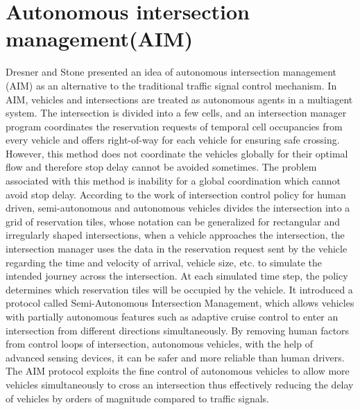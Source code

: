 \documentclass{book}
\begin{document}
	\section{Autonomous intersection management(AIM)}
	Dresner and Stone \cite{dresner2008multiagent} presented an idea of autonomous intersection management (AIM) as an alternative to the traditional traffic signal control mechanism. In AIM, vehicles and intersections are treated as autonomous agents in a multiagent system. The intersection is divided into a few cells, and an intersection manager program coordinates the reservation requests of temporal cell occupancies from every vehicle and
offers right-of-way for each vehicle for ensuring safe crossing. However, this method does not coordinate the vehicles globally for their optimal flow and therefore stop delay cannot be avoided sometimes. The problem associated with this method is inability for a global coordination which cannot avoid stop delay. According to the work of \cite{au2015autonomous} intersection control policy for human driven, semi-autonomous and autonomous vehicles divides the intersection into a grid of reservation tiles, whose notation can be generalized for rectangular and irregularly shaped intersections, when a vehicle approaches the intersection, the intersection manager uses the data in the reservation request sent by the vehicle regarding the time and velocity of arrival, vehicle size, etc. to simulate the intended journey across the intersection. At each simulated time step, the policy determines which reservation tiles will be occupied by the vehicle. It introduced a protocol called Semi-Autonomous Intersection Management, which allows vehicles with partially autonomous features such as adaptive cruise control to enter an intersection from different directions simultaneously.
By removing human factors from control loops of intersection, autonomous vehicles, with the help of advanced sensing devices, it can be safer and more reliable than human drivers. The AIM protocol exploits the fine control of autonomous vehicles to allow more vehicles simultaneously to cross an intersection thus effectively reducing the delay of vehicles by orders of magnitude compared to traffic signals\cite{dresner2008multiagent,fajardo2011automated}.\\
\end{document}
